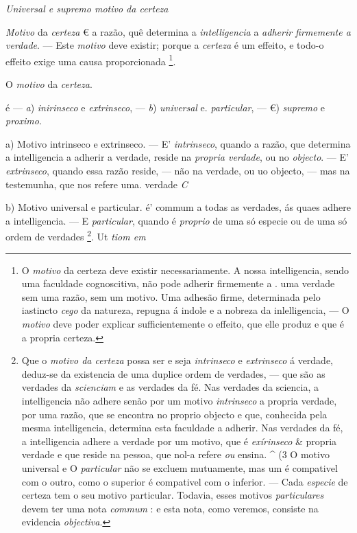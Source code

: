 \emph{Universal e supremo motivo da certeza}


 
\emph{Motivo} da \emph{certeza} € a razão, quê determina a \emph{intelligencia} a \emph{adherir firmemente a verdade}. --- Este \emph{motivo} deve existir; porque a \emph{certeza} é um effeito, e todo-o effeito exige uma causa proporcionada \footnote{O \emph{motivo} da certeza deve existir necessariamente. A nossa intelligencia, sendo uma faculdade cognoscitiva, não pode adherir firmemente a . uma verdade sem uma razão, sem um motivo. Uma adhesão firme, determinada pelo iastincto \emph{cego} da natureza, repugna á indole e a nobreza da inlelligencia, --- O \emph{motivo} deve poder explicar sufficientemente o effeito, que elle produz e que é a propria certeza.}.


O \emph{motivo} da \emph{certeza}.

é --- \emph{a}) \emph{inirinseco} e \emph{extrinseco}, --- \emph{b}) \emph{universal} e. \emph{particular}, --- €) \emph{supremo} e \emph{proximo}.

a) Motivo intrinseco e extrinseco. --- E' \emph{intrinseco}, quando a razão, que determina a intelligencia a adherir a verdade, reside na \emph{propria verdade}, ou no \emph{objecto}. --- E' \emph{extrinseco}, quando essa razão reside, --- não na verdade, ou uo objecto, --- mas na testemunha, que nos refere uma. verdade \emph{C}

b) Motivo universal e particular. é' commum a todas as verdades, ás quaes adhere a intelligencia. --- E \emph{particular}, quando é \emph{proprio} de uma só especie ou de uma só ordem de verdades \footnote{Que o \emph{motivo da certeza} possa ser e seja \emph{intrinseco} e \emph{extrinseco} á verdade, deduz-se da existencia de uma duplice ordem de verdades, --- que são as verdades da \emph{scienciam} e as verdades da fé. Nas verdades da sciencia, a intelligencia não adhere senão por um motivo \emph{intrinseco} a propria verdade, por uma razão, que se encontra no proprio objecto e que, conhecida pela mesma intelligencia, determina esta faculdade a adherir. Nas verdades da fé, a intelligencia adhere a verdade por um motivo, que é \emph{exírinseco} \& propria verdade e que reside na pessoa, que nol-a refere \emph{ou} ensina. \textasciicircum{} (3 O motivo universal e O \emph{particular} não se excluem mutuamente, mas um é compativel com o outro, como o superior é compativel com o inferior. --- Cada \emph{especie} de certeza tem o seu motivo particular. Todavia, esses motivos \emph{particulares} devem ter uma nota \emph{commum} : e esta nota, como veremos, consiste na evidencia \emph{objectiva}.\par *}. Ut \emph{tiom em}

